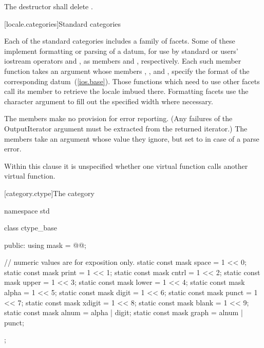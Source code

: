 \begin{itemdescr}
\pnum
\effects The destructor shall delete .
\end{itemdescr}

[locale.categories]{Standard  categories}

\pnum
Each of the standard categories includes a family of facets.
Some of these implement formatting or parsing of a datum, for use
by standard or users' iostream operators
\tcode{\shl}
and
\tcode{\shr},
as members
and
,
respectively.
Each such member function takes an
%
argument whose members
%
,
%
,
and
%
,
specify the format of the corresponding datum~(\ref{ios.base}).
Those functions which need to use other facets call its member
to retrieve the locale imbued there.
Formatting facets use the character argument
to fill out the specified width where necessary.

\pnum
The
members make no provision for error reporting.
(Any failures of the
OutputIterator argument must be extracted from the returned iterator.)
The
members take an
argument whose value they ignore, but set to
in case of a parse error.

\pnum
Within this clause it is unspecified whether one virtual function calls another
virtual function.

[category.ctype]{The  category}

%
\begin{codeblock}
namespace std {
  class ctype_base {
  public:
    using mask = @@;

    // numeric values are for exposition only.
    static const mask space = 1 << 0;
    static const mask print = 1 << 1;
    static const mask cntrl = 1 << 2;
    static const mask upper = 1 << 3;
    static const mask lower = 1 << 4;
    static const mask alpha = 1 << 5;
    static const mask digit = 1 << 6;
    static const mask punct = 1 << 7;
    static const mask xdigit = 1 << 8;
    static const mask blank = 1 << 9;
    static const mask alnum = alpha | digit;
    static const mask graph = alnum | punct;
  };
}
\end{codeblock}

